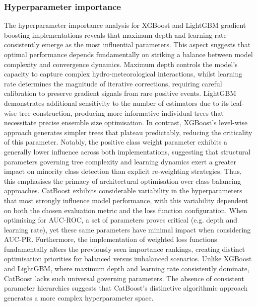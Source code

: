 \subsubsection{Hyperparameter importance}

The  hyperparameter importance analysis for XGBoost and LightGBM gradient boosting implementations reveals that maximum depth and learning rate consistently emerge as the most influential parameters. This aspect suggests that optimal performance depends fundamentally on striking a balance between model complexity and convergence dynamics. Maximum depth controls the model's capacity to capture complex hydro-meteorological interactions, whilst learning rate determines the magnitude of iterative corrections, requiring careful calibration to preserve gradient signals from rare positive events. LightGBM demonstrates additional sensitivity to the number of estimators due to its leaf-wise tree construction, producing more informative individual trees that necessitate precise ensemble size optimisation. In contrast, XGBoost's level-wise approach generates simpler trees that plateau predictably, reducing the criticality of this parameter. Notably, the positive class weight parameter exhibits a generally lower influence across both implementations, suggesting that structural parameters governing tree complexity and learning dynamics exert a greater impact on minority class detection than explicit re-weighting strategies. Thus, this emphasises the primacy of architectural optimisation over class balancing approaches. CatBoost exhibits considerable variability in the hyperparameters that most strongly influence model performance, with this variability dependent on both the chosen evaluation metric and the loss function configuration. When optimising for AUC-ROC, a set of parameters proves critical (e.g. depth and learning rate), yet these same parameters have minimal impact when considering AUC-PR. Furthermore, the implementation of weighted loss functions fundamentally alters the previously seen importance rankings, creating distinct optimisation priorities for balanced versus imbalanced scenarios. Unlike XGBoost and LightGBM, where maximum depth and learning rate consistently dominate, CatBoost lacks such universal governing parameters. The absence of consistent parameter hierarchies suggests that CatBoost's distinctive algorithmic approach generates a more complex hyperparameter space. 

